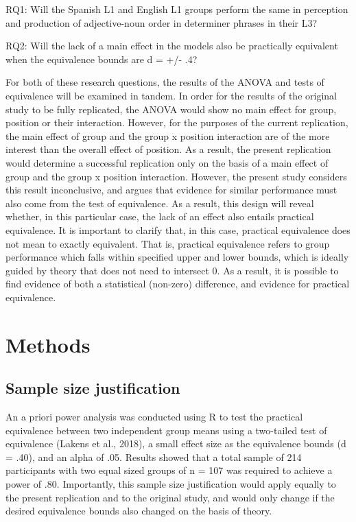 \documentclass[
  man,floatsintext]{apa6}
\begin{document}
RQ1: Will the Spanish L1 and English L1 groups perform the same in perception and production of adjective-noun order in determiner phrases in their L3?

RQ2: Will the lack of a main effect in the models also be practically equivalent when the equivalence bounds are d = +/- .4?

For both of these research questions, the results of the ANOVA and tests of equivalence will be examined in tandem.
In order for the results of the original study to be fully replicated, the ANOVA would show no main effect for group, position or their interaction.
However, for the purposes of the current replication, the main effect of group and the group x position interaction are of the more interest than the overall effect of position.
As a result, the present replication would determine a successful replication only on the basis of a main effect of group and the group x position interaction.
However, the present study considers this result inconclusive, and argues that evidence for similar performance must also come from the test of equivalence.
As a result, this design will reveal whether, in this particular case, the lack of an effect also entails practical equivalence.
It is important to clarify that, in this case, practical equivalence does not mean to exactly equivalent.
That is, practical equivalence refers to group performance which falls within specified upper and lower bounds, which is ideally guided by theory that does not need to intersect 0.
As a result, it is possible to find evidence of both a statistical (non-zero) difference, and evidence for practical equivalence.

\hypertarget{methods}{%
\section{Methods}\label{methods}}

\hypertarget{sample-size-justification}{%
\subsection{Sample size justification}\label{sample-size-justification}}

An a priori power analysis was conducted using R to test the practical equivalence between two independent group means using a two-tailed test of equivalence (Lakens et al., 2018), a small effect size as the equivalence bounds (d = .40), and an alpha of .05.
Results showed that a total sample of 214 participants with two equal sized groups of n = 107 was required to achieve a power of .80.
Importantly, this sample size justification would apply equally to the present replication and to the original study, and would only change if the desired equivalence bounds also changed on the basis of theory.
\end{document}
